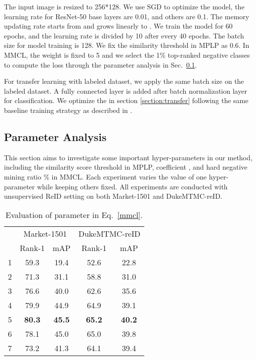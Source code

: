 \documentclass[10pt,twocolumn,letterpaper]{article}
\begin{document}
The input image is resized to 256*128. We use SGD to optimize the model, the learning rate for ResNet-50 base layers are 0.01, and others are 0.1. The memory updating rate  starts from  and grows linearly to . We train the model for 60 epochs, and the learning rate is divided by 10 after every 40 epochs. The batch size for model training is 128. We fix the similarity threshold  in MPLP as 0.6. In MMCL, the weight  is fixed to 5 and we select the 1\% top-ranked negative classes to compute the loss through the parameter analysis in Sec.~\ref{section:pa}.

For transfer learning with labeled dataset, we apply the same batch size on the labeled dataset. A fully connected layer is added after batch normalization layer for classification. We optimize the  in section \ref{section:transfer} following the same baseline training strategy as described in \cite{Fu_2019_ICCV}.

\vspace{-1mm}
\subsection{Parameter Analysis}\label{section:pa}
\vspace{-1mm}
This section aims to investigate some important hyper-parameters in our method, including the similarity score threshold  in MPLP, coefficient , and hard negative mining ratio \% in MMCL. Each experiment varies the value of one hyper-parameter while keeping others fixed. All experiments are conducted with unsupervised ReID setting on both Market-1501 and DukeMTMC-reID.

\begin{table}
\footnotesize
\begin{center}
\begin{tabular}{p{1cm}<{\centering}|cc|cc}
\hline
\multirow{2}{*}{} & \multicolumn{2}{c|}{Market-1501} & \multicolumn{2}{c}{DukeMTMC-reID}\\
\cline{2-5}
 & Rank-1 & mAP & Rank-1 & mAP  \\
\hline\hline
1 & 59.3 & 19.4 & 52.6 & 22.8 \\
2 & 71.3 & 31.1 & 58.8 & 31.0 \\
3 & 76.6 & 40.0 & 62.6 & 35.6 \\
4 & 79.9 & 44.9 & 64.9 & 39.1 \\
5 & \textbf{80.3} & \textbf{45.5} & \textbf{65.2} & \textbf{40.2}\\
6 & 78.1 & 45.0 & 65.0 & 39.8\\
7 & 73.2 & 41.3 & 64.1 & 39.4\\
\hline
\end{tabular}
\end{center}
\vspace{-2mm}
\caption{Evaluation of parameter  in Eq.~\eqref{mmcl}.}
\vspace{-2mm}
\label{table:pa-delta}
\end{table}
\end{document}
